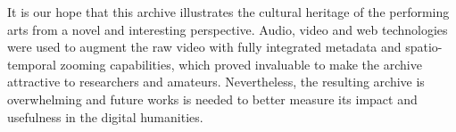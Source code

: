 \documentclass[conference]{IEEEtran}
\newcommand{\todo}[1]{\noindent\textcolor{red}{{\bf \{ToDo} #1{\bf \}}}}
\begin{document}
It is our hope that this archive illustrates the cultural heritage of the performing arts from a novel and 
interesting perspective. Audio, video and web technologies were used to augment
the raw video with fully integrated metadata and spatio-temporal zooming capabilities,
which proved invaluable to make the archive attractive to researchers and amateurs.
Nevertheless, the resulting archive is overwhelming and future works is needed to 
better measure its impact and usefulness in the digital humanities. 


















\end{document}
